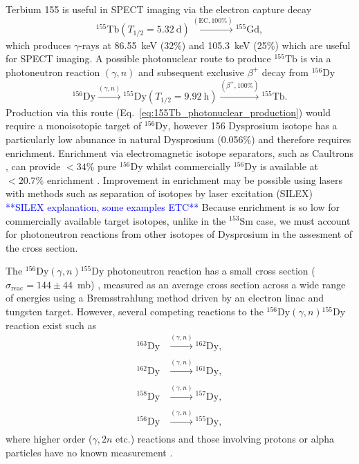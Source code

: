 \documentclass[../main.tex]{subfiles}
\begin{document}
Terbium 155 is useful in SPECT imaging via the electron capture decay
\begin{equation}
^{155}\mathrm{Tb}\left(T_{1/2} = 5.32~\mathrm{\si{\day}}\right)\xrightarrow[]{\left(\mathrm{EC}, \mathrm{100\%}\right)}{}^{155}\mathrm{Gd},
\label{eq:Tb155_decay}
\end{equation}
which produces $\gamma$-rays at 86.55~\si{\kilo\electronvolt} (32\%) and 105.3~\si{\kilo\electronvolt} (25\%)\cite{muller2012unique} which are useful for SPECT imaging. A possible photonuclear route to produce $^{155}\mathrm{Tb}$ is via a photoneutron reaction $\left(\gamma,n\right)$ and subsequent exclusive $\beta^{+}$ decay from $^{156}\mathrm{Dy}$
\begin{equation}
^{156}\mathrm{Dy}\xrightarrow[]{\left(\gamma,n\right)}{}^{155}\mathrm{Dy}\left(T_{1/2} = 9.92~\mathrm{\si{\hour}}\right)\xrightarrow[]{\left(\beta^{+},\mathrm{100\%}\right)}{}^{155}\mathrm{Tb}.    
\label{eq:155Tb_photonuclear_production}
\end{equation}
Production via this route (Eq.~\ref{eq:155Tb_photonuclear_production}) would require a monoisotopic target of $^{156}\mathrm{Dy}$, however 156 Dysprosium isotope has a particularly low abunance in natural Dysprosium (0.056\%) and therefore requires enrichment. Enrichment via electromagnetic isotope separators, such as Caultrons \cite{bell1987stable}, can provide $< 34\%$ pure $^{156}\mathrm{Dy}$ whilst commercially $^{156}\mathrm{Dy}$ is available at $< 20.7\%$ enrichment \cite{}. Improvement in enrichment may be possible using lasers with methods such as separation of isotopes by laser excitation (SILEX)\cite{} \textcolor{blue}{**SILEX explanation, some examples ETC**} Because enrichment is so low for commercially available target isotopes, unlike in the $^{153}\mathrm{Sm}$ case, we must account for photoneutron reactions from other isotopes of Dysprosium in the assesment of the cross section.

The $^{156}\mathrm{Dy}\left(\gamma,n\right){}^{155}\mathrm{Dy}$ photoneutron reaction has a small cross section ($\sigma_{\mathrm{reac}} = 144\pm 44$~\si{\milli\barn}) \cite{vagena2017photodisintegration}, measured as an average cross section across a wide range of energies using a Bremsstrahlung method driven by an electron linac and tungsten target. However, several competing reactions to the $^{156}\mathrm{Dy}\left(\gamma,n\right){}^{155}\mathrm{Dy}$ reaction exist such as \cite{renstrom2018verification,vagena2017photodisintegration}
\begin{align}
^{163}\mathrm{Dy}&\xrightarrow[]{\left(\gamma,n\right)}{}^{162}\mathrm{Dy}, \\
^{162}\mathrm{Dy}&\xrightarrow[]{\left(\gamma,n\right)}{}^{161}\mathrm{Dy}, \\
^{158}\mathrm{Dy}&\xrightarrow[]{\left(\gamma,n\right)}{}^{157}\mathrm{Dy}, \\
^{156}\mathrm{Dy}&\xrightarrow[]{\left(\gamma,n\right)}{}^{155}\mathrm{Dy},
\label{eq:155Tb_photonuclear_disruptors}    
\end{align}
where higher order ($\gamma,2n$ etc.) reactions and those involving protons or alpha particles have no known measurement \cite{zerkin2018experimental}.
\end{document}

